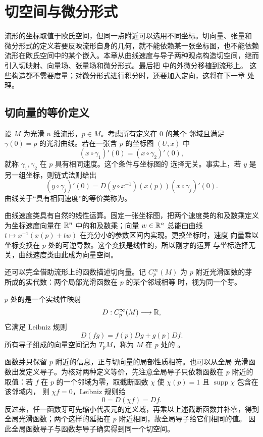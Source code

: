 \chapter{切空间与微分形式}
\label{chap:tangent-differential-forms}

流形的坐标取值于欧氏空间，但同一点附近可以选用不同坐标。切向量、张量和
微分形式的定义若要反映流形自身的几何，就不能依赖某一张坐标图，也不能依赖
流形在欧氏空间中的某个嵌入。本章从曲线速度与导子两种观点构造切空间，继而
引入切映射、向量场、张量场和微分形式。最后把
中的外微分移植到流形上。
这些构造都不需要度量；对微分形式进行积分时，还要加入定向，这将在下一章
处理。

\section{切向量的等价定义}

设 \(M\) 为光滑 \(n\) 维流形，\(p\in M\)。考虑所有定义在 \(0\) 的某个
邻域且满足 \(\gamma(0)=p\) 的光滑曲线。若在一张含 \(p\) 的坐标图
\((U,x)\) 中
\[
 (x\circ\gamma_1)'(0)=(x\circ\gamma_2)'(0),
\]
就称 \(\gamma_1,\gamma_2\) 在 \(p\) 具有相同速度。这个条件与坐标图的
选择无关。事实上，若 \(y\) 是另一组坐标，则链式法则给出
\[
 (y\circ\gamma_j)'(0)
 =D(y\circ x^{-1})(x(p))(x\circ\gamma_j)'(0).
\]
曲线关于“具有相同速度”的等价类称为。

曲线速度类具有自然的线性运算。固定一张坐标图，把两个速度类的和及数乘定义
为坐标速度向量在 \(\mathbb{R}^n\) 中的和及数乘；向量 \(w\in\mathbb{R}^n\) 总能由曲线
\(t\mapsto x^{-1}(x(p)+tw)\) 在充分小的参数区间内实现。更换坐标时，速度
向量乘以坐标变换在 \(p\) 处的可逆导数。这个变换是线性的，所以刚才的运算
与坐标选择无关，曲线速度类由此成为向量空间。

还可以完全借助流形上的函数描述切向量。记 \(C_p^\infty(M)\) 为 \(p\)
附近光滑函数的芽所成的实代数：两个局部光滑函数在 \(p\) 的某个邻域相等
时，视为同一个芽。

\begin{definition}
\label{def:tangent-derivation}
\(p\) 处的是一个实线性映射
\[
 D:C_p^\infty(M)\longrightarrow\mathbb{R},
\]
它满足 Leibniz 规则
\[
 D(fg)=f(p)Dg+g(p)Df.
\]
所有导子组成的向量空间记为 \(T_pM\)，称为 \(M\) 在 \(p\) 处的
。
\end{definition}

函数芽只保留 \(p\) 附近的信息，正与切向量的局部性质相符。也可以从全局
光滑函数出发定义导子。为核对两种定义等价，先注意全局导子只依赖函数在
\(p\) 附近的取值：若 \(f\) 在 \(p\) 的一个邻域为零，取截断函数
\(\chi\) 使 \(\chi(p)=1\) 且 \(\operatorname{supp}\chi\) 包含在该邻域内，
则 \(\chi f=0\)，Leibniz 规则给
\[
 0=D(\chi f)=Df.
\]
反过来，任一函数芽可先缩小代表元的定义域，再乘以上述截断函数并补零，得到
全局光滑函数；两个这样的延拓在 \(p\) 附近相同，故全局导子给它们相同的值。
因此全局函数导子与函数芽导子确实得到同一个切空间。

